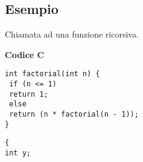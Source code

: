 \documentclass[../main.tex]{subfiles}
\begin{document}
\begin{tabular}{ l }
    \hline
    \hline
\end{tabular}

\newpage

\subsection*{Esempio}
Chiamata ad una funzione ricorsiva.
\begin{table}[h!]
    \textbf{Codice C} \\[2mm]
    \begin{minipage}{.5\linewidth}
        \texttt{\texttt{int factorial(int n) \{} \\
            \texttt{\hspace*{0cm} \hspace*{0cm} \hspace*{0cm} \hspace*{0cm} if (n <= 1)} \\
            \texttt{\hspace*{0cm} \hspace*{0cm} \hspace*{0cm} \hspace*{0cm} \hspace*{0cm} \hspace*{0cm} \hspace*{0cm} \hspace*{0cm} return 1;} \\
            \texttt{\hspace*{0cm} \hspace*{0cm} \hspace*{0cm} \hspace*{0cm} else} \\
            \texttt{\hspace*{0cm} \hspace*{0cm} \hspace*{0cm} \hspace*{0cm} \hspace*{0cm} \hspace*{0cm} \hspace*{0cm} \hspace*{0cm} return (n * factorial(n - 1));} \\
            \texttt{\}} \\
        }
    \end{minipage}
    \begin{minipage}{.5\linewidth}
        \texttt{\{ \\
            \hspace*{0cm} \hspace*{0cm} \hspace*{0cm} \hspace*{0cm} int y; \\
}
\end{minipage}
\end{table}
\end{document}
